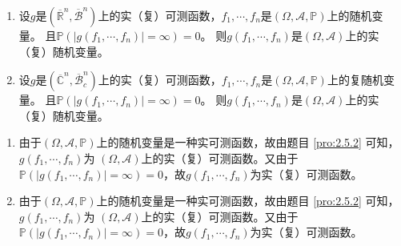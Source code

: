 \documentclass{ctexart}
\begin{document}
\begin{problem}\label{pro:2.5.3}
  \begin{enumerate}
    \item   设\(g \)是\((\overline{\mathbb{R}}^n,\overline{\mathcal{B}}^n) \)上的实（复）可测函数，\(f_1,\cdots,f_n \)是\((\Omega,\mathcal{A},\mathbb{P}) \)上的随机变量。
      且\(\mathbb{P}(|g(f_1,\cdots,f_n)|=\infty)=0 \)。 则\(g(f_1,\cdots,f_n) \)是\((\Omega,\mathcal{A}) \)上的实（复）随机变量。
    \item   设\(g \)是\((\overline{\mathbb{C}}^n,\overline{\mathcal{B}}^n_c) \)上的实（复）可测函数，\(f_1,\cdots,f_n \)是\((\Omega,\mathcal{A},\mathbb{P}) \)上的复随机变量。
      且\(\mathbb{P}(|g(f_1,\cdots,f_n)|=\infty)=0 \)。 则\(g(f_1,\cdots,f_n) \)是\((\Omega,\mathcal{A}) \)上的实（复）随机变量。
  \end{enumerate}
\end{problem}
\begin{solution}
  \begin{enumerate}
    \item 由于\((\Omega,\mathcal{A},\mathbb{P}) \)上的随机变量是一种实可测函数，故由题目 \ref{pro:2.5.2} 可知，\(g(f_1,\cdots,f_n) \)为 
  \((\Omega,\mathcal{A}) \)上的实（复）可测函数。又由于\(\mathbb{P}(|g(f_1,\cdots,f_n)|=\infty)=0 \)，故\(g(f_1,\cdots,f_n) \)为实（复）可测函数。
\item 由于\((\Omega,\mathcal{A},\mathbb{P}) \)上的随机变量是一种实可测函数，故由题目 \ref{pro:2.5.2} 可知，\(g(f_1,\cdots,f_n) \)为 
  \((\Omega,\mathcal{A}) \)上的实（复）可测函数。又由于\(\mathbb{P}(|g(f_1,\cdots,f_n)|=\infty)=0 \)，故\(g(f_1,\cdots,f_n) \)为实（复）可测函数。
  \end{enumerate}

\end{solution}
\end{document}
